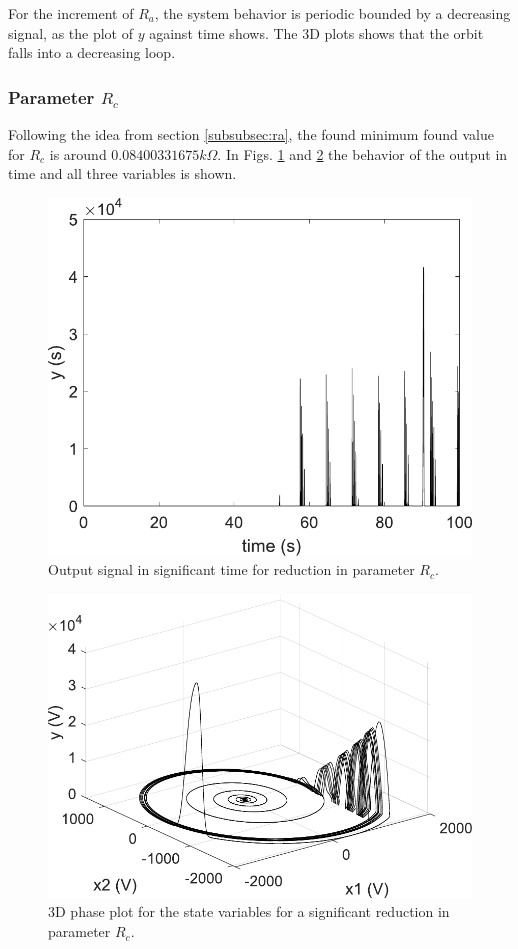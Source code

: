     For the increment of $R_a$, the system behavior is periodic bounded by a decreasing signal, as the plot of $y$ against time shows. The 3D plots shows that the orbit falls into a decreasing loop.
    
    \subsubsection{Parameter \texorpdfstring{$R_c$}{Rc}}
    Following the idea from section \ref{subsubsec:ra}, the found minimum found value for $R_c$ is around $0.08400331675k\Omega$. In Figs. \ref{fig:outParaCdown} and \ref{fig:3dParaCdown} the behavior of the output in time and all three variables is shown.
    \begin{figure}[H]
        \centering
        \includegraphics[scale=0.5]{figs/outParaCdown.pdf}
        \caption{Output signal in significant time for reduction in parameter $R_c$.}
        \label{fig:outParaCdown}
    \end{figure}
    \begin{figure}[H]
        \centering
        \includegraphics[scale=0.5]{figs/3dParaCdown.pdf}
        \caption{3D phase plot for the state variables for a significant reduction in parameter $R_c$.}
        \label{fig:3dParaCdown}
    \end{figure}
    
